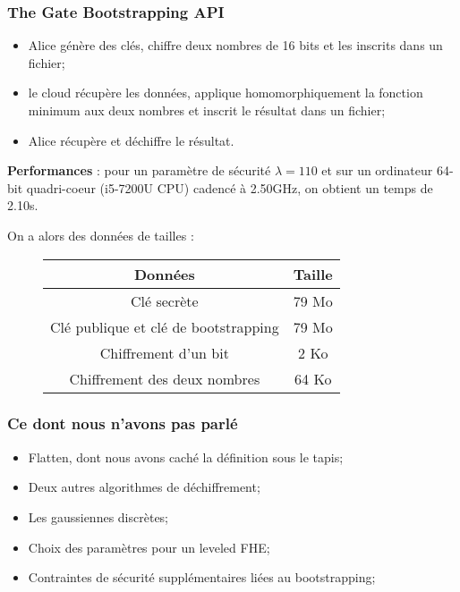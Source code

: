 \documentclass[10pt,xcolor={usenames,dvipsnames}]{beamer}
\begin{document}
\begin{frame} 
\frametitle{The Gate Bootstrapping API}
\begin{itemize}
\item Alice génère des clés, chiffre deux nombres de 16 bits et les inscrits dans un fichier;
\item le cloud récupère les données, applique homomorphiquement la fonction minimum aux deux nombres et inscrit le résultat dans un fichier;
\item Alice récupère et déchiffre le résultat.
\end{itemize}
\textbf{Performances} : pour un paramètre de sécurité $\lambda = 110$ et sur un ordinateur 64-bit quadri-coeur (i5-7200U CPU) cadencé à 2.50GHz, on obtient un temps de 2.10s.

On a alors des données de tailles :

\begin{figure}
\begin{tabular}{|c|c|}
\hline
Données & Taille \\
\hline
Clé secrète & 79 Mo \\
\hline
Clé publique et clé de bootstrapping  & 79 Mo \\
\hline
Chiffrement d'un bit & 2 Ko \\
\hline
Chiffrement des deux nombres & 64 Ko\\
\hline
\end{tabular}
\end{figure}

\end{frame} 


\begin{frame}
\frametitle{Ce dont nous n'avons pas parlé}
\begin{itemize}
\item Flatten, dont nous avons caché la définition sous le tapis;
\item Deux autres algorithmes de déchiffrement;
\item Les gaussiennes discrètes;
\item Choix des paramètres pour un leveled FHE;
\item Contraintes de sécurité supplémentaires liées au bootstrapping;
\end{itemize}
\end{frame}

\end{document}
